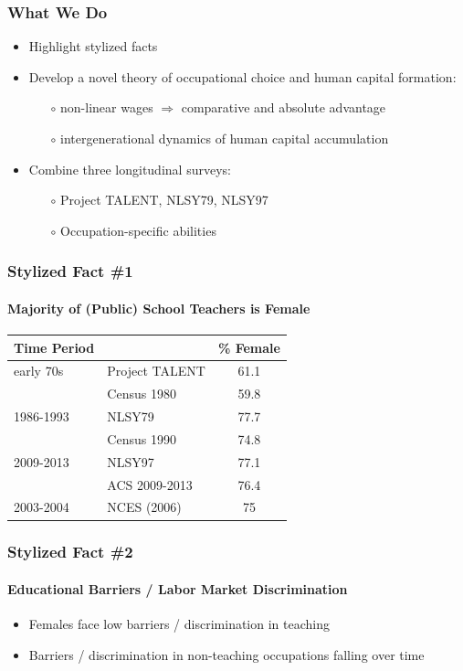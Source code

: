 \documentclass[11pt]{beamer}
\begin{document}
	\begin{frame}
		\frametitle{What We Do}
		\vfill
		\begin{itemize}
			\item Highlight stylized facts
			\vfill
			\item Develop a novel theory of occupational choice and human capital formation: 
			\begin{itemize}
				\item[$\circ$] non-linear wages $\Rightarrow$ comparative and absolute advantage
				\item[$\circ$] intergenerational dynamics of human capital accumulation
			\end{itemize}
			\vfill
			\item Combine three longitudinal surveys: 
			\begin{itemize}
				\item[$\circ$] Project TALENT, NLSY79, NLSY97
				\item[$\circ$] Occupation-specific abilities
			\end{itemize}
		\end{itemize}
		\vfill
	\end{frame}
	
	\begin{frame}
		\frametitle{Stylized Fact \#1}
		\framesubtitle{Majority of (Public) School Teachers is Female}
		\begin{table}[h!]
			\centering 
			\begin{tabular}{l l c }
				\toprule
				Time Period & & \% Female \\
				\midrule
				early 70s & Project TALENT  &  61.1 \\
				& Census 1980 &  59.8 \\
				1986-1993 & NLSY79  & 77.7   \\
				& Census 1990 & 74.8 \\
				2009-2013& NLSY97  & 77.1   \\
				& ACS 2009-2013  & 76.4  \\
				\midrule
				2003-2004 & NCES (2006) & 75\\
				\bottomrule
			\end{tabular}
		\end{table}
	\end{frame}
	
	\begin{frame}
		\frametitle{Stylized Fact \#2}
		\framesubtitle{Educational Barriers / Labor Market Discrimination}
		\begin{itemize}
			\item Females face low barriers / discrimination in teaching
			\item Barriers / discrimination in non-teaching occupations falling over time
		\end{itemize}
	\end{frame}
	
\end{document}
